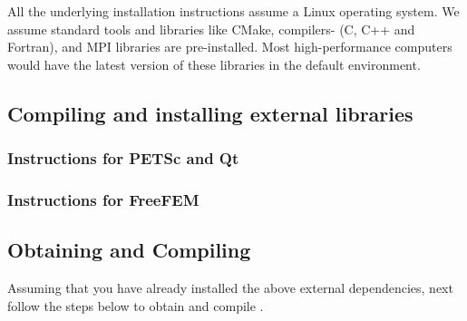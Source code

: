 All the underlying installation instructions assume a Linux operating system. We assume standard tools and libraries like CMake, compilers- (C, C++ and Fortran), and MPI libraries are pre-installed. Most high-performance computers would have the latest version of these libraries in the default environment. 

\subsection{Compiling and installing external libraries}

\subsubsection{Instructions for PETSc and Qt}

\subsubsection{Instructions for FreeFEM}

\subsection{Obtaining and Compiling \biodeg{}}

Assuming that you have already installed the above external dependencies, next follow the steps below to obtain and compile \biodeg{}.

